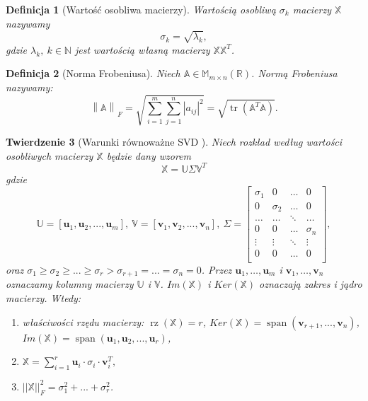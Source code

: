 \documentclass[12pt,a4paper]{report}
\newtheorem{df}{Definicja}[chapter]
\newtheorem{tw}[df]{Twierdzenie}
\newcommand{\setN}{\mathbb{N}}
\newcommand{\przestrzen}[1]{\operatorname{span}\left({#1} \right)}
\newcommand{\norm}[2][]{\left\| {#2} \right\|_{#1}}
\newcommand{\rz}[1]{\operatorname{rz}\left({#1} \right)}
\newcommand{\tr}[1]{\operatorname{tr}\left({#1} \right)}
\begin{document}
\begin{df}[Wartość osobliwa macierzy]
Wartością osobliwą $\sigma_k$ macierzy $\mathbb{X}$ nazywamy
$$
\sigma_k = \sqrt{\lambda_k},
$$
gdzie $\lambda_k, \: k \in \setN$ jest wartością własną macierzy $\mathbb{X} \mathbb{X}^T$.
\end{df}

\begin{df}[Norma Frobeniusa{\citep{ulafiir}}] %
Niech $\mathbb{A}\in \mathbb{M}_{m\times n}(\mathbb{R})$. Normą Frobeniusa nazywamy:
$$
{\norm{\mathbb{A}}}_F = \sqrt{\sum_{i=1}^m \sum_{j=1}^n |a_{ij}|^2} = \sqrt{\tr{\mathbb{A}^T \mathbb{A}}}.
$$
\end{df}

\begin{tw}[Warunki równoważne SVD {\citep{ulafiir}}]%
Niech rozkład według wartości osobliwych macierzy $\mathbb{X}$ będzie dany wzorem
$$
\mathbb{X}=\mathbb{U} \Sigma \mathbb{V}^T
$$
gdzie 
$$\mathbb{U}=[\mathbf{u}_1,\mathbf{u}_2,...,\mathbf{u}_m], \: \mathbb{V} = [\mathbf{v}_1,\mathbf{v}_2,...,\mathbf{v}_n], \: \Sigma = \left[
        \begin{array}{cccc}
         \sigma_{1} & 0 & \ldots & 0 \\
         0 & \sigma_{2} & \ldots & 0 \\
         \ldots & \ldots& \ddots & \ldots \\
         0 & 0 & \ldots & \sigma_{n} \\
         \vdots & \vdots & \ddots & \vdots \\
         0 & 0 & \ldots & 0 \\
         \end{array}
      \right],$$
oraz 
$\sigma_{1}\geq \sigma_{2} \geq ... \geq \sigma_{r} > \sigma_{r+1} = ... = \sigma_{n} = 0$. Przez $\mathbf{u}_1, \ldots, \mathbf{u}_m$ i $\mathbf{v}_1, \ldots, \mathbf{v}_n$ oznaczamy kolumny macierzy $\mathbb{U}$ i $\mathbb{V}$.
$Im(\mathbb{X})$ i $Ker(\mathbb{X})$ oznaczają zakres i jądro macierzy.
Wtedy:
\begin{enumerate}
\item właściwości rzędu macierzy: $\rz{\mathbb{X}} = r$, $Ker(\mathbb{X}) = \przestrzen{\mathbf{v}_{r+1},...,\mathbf{v}_n}$, 
$Im(\mathbb{X}) = \przestrzen{\mathbf{u}_1,\mathbf{u}_2,...,\mathbf{u}_r}$,
\item $\mathbb{X} = \sum_{i=1}^r \mathbf{u}_i \cdot\sigma_i \cdot \mathbf{v}_i^T,$
\item $||\mathbb{X}||_F^2 = \sigma_{1}^2+...+\sigma_{r}^2$.
\end{enumerate}
\end{tw}
\end{document}
